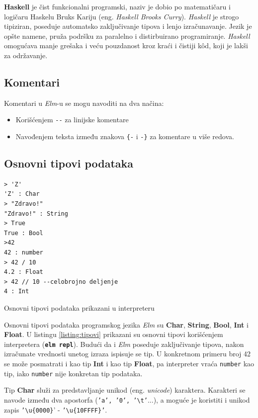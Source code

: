 \documentclass[12pt,oneside]{memoir}
\begin{document}
\textbf{Haskell}\cite{haskell} je čist funkcionalni programski, naziv je dobio po matematičaru i 
logičaru Haskelu Bruks Kariju (eng. \emph{Haskell Brooks Curry}). \emph{Haskell} je strogo 
tipiziran, poseduje automatsko zaključivanje tipova i lenjo izračunavanje. Jezik je 
opšte namene, pruža podršku za paralelno i distirbuirano programiranje. \emph{Haskell} 
omogućava manje grešaka i veću pouzdanost kroz kraći i čistiji k\^{o}d, koji je lakši za
održavanje. 


\subsection{Komentari}
Komentari u \emph{Elm}-u se mogu navoditi na dva načina: \begin{itemize}
  \item Korišćenjem \texttt{-{}-} za linijske komentare
  \item Navođenjem teksta između znakova \texttt{\{-} i \texttt{-\}} za komentare u više redova.    
\end{itemize}

\subsection{Osnovni tipovi podataka}
\begin{listing}[h]
\begin{verbatim}
> 'Z'
'Z' : Char
> "Zdravo!"
"Zdravo!" : String
> True
True : Bool
>42
42 : number
> 42 / 10 
4.2 : Float
> 42 // 10 --celobrojno deljenje
4 : Int
\end{verbatim}
\caption{Osnovni tipovi podataka prikazani u interpreteru}
\label{listing:tipovi}
\end{listing}
Osnovni tipovi podataka programskog jezika \emph{Elm} su \textbf{Char}, \textbf{String}, \textbf{Bool},
\textbf{Int} i \textbf{Float}. U listingu \ref{listing:tipovi} prikazani su osnovni
tipovi korišćenjem interpretera (\texttt{\textbf{elm repl}}). Budući da i \emph{Elm} poseduje zaključivanje tipova, nakon
izračunate vrednosti unetog izraza ispisuje se tip. U konkretnom primeru broj 42 se
može posmatrati i kao tip \textbf{Int} i kao tip \textbf{Float}, pa interpreter vraća
\texttt{number} kao tip, iako \texttt{number} nije konkretan tip podataka.


Tip \textbf{Char} služi za predstavljanje unikod (eng. \emph{unicode}) karaktera.
Karakteri se navode između dva apostorfa (\texttt{'a', '0', '\textbackslash t'}...), a
moguće je koristiti i unikod zapis  \texttt{'\textbackslash u\{0000\}}' -
\texttt{'\textbackslash u\{10FFFF\}'}.
\end{document}
